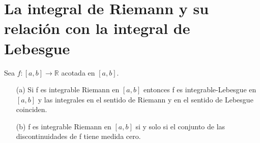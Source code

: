 \section{La integral de Riemann y su relación con la integral de Lebesgue}

\begin{teo}
    Sea $f: [a,b] \longrightarrow \mathbb{R}$ acotada en $[a,b]$.
    \begin{enumerate}
        \item[(a)] Si f es integrable Riemann en $[a,b]$ entonces f es integrable-Lebesgue en $[a,b]$ y las integrales en el sentido de Riemann y en el sentido de Lebesgue coinciden.
        \item[(b)] f es integrable Riemann en $[a,b]$ si y solo si el conjunto de las discontinuidades de f tiene medida cero.
    \end{enumerate}
\end{teo}

